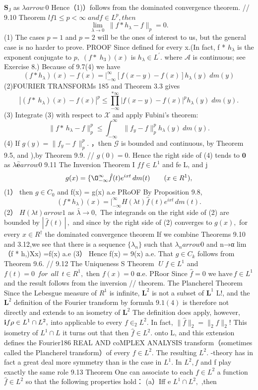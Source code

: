 ${\boldsymbol{S}}_{\mathsf{J}}$ as $\lambda{ arrow}\,0$ Hence（1)）follows from the dominated convergence theorem. // 9.10 Theorem $l f1\leq p<\infty\;a n d f\in L^{p},t h e n$ $$ \operatorname*{lim}_{\lambda\to0}\;\|f*h_{\lambda}-f\|_{p}=0. $$ (1) The cases $p=1$ and $p=2$ will be the ones of interest to us, but the general case is no harder to prove. PROOF Since defined for every x.(In fact, f * $h_{\lambda}$ is the exponent conjugate to $p,\;(f*\;h_{3})(x)$ is $h_{\lambda}\in L^{\prime}.$ where $\scriptstyle{\mathcal{A}}$ is continuous; see Exercise 8.) Because of 9.7(4) we have $$ (f*h_{\lambda})(x)-f(x)=\left.\right|_{-\infty}^{\infty}[f(x-y)-f(x)]h_{\lambda}(y)\;d m(y) $$ (2)FOURIER TRANSFORMs 185 and Theorem 3.3 gives $$ |(f*~h_{\lambda})(x)-f(x)|^{p}\leq\prod_{-\infty}^{*\infty}|f(x-y)-f(x)|^{p}h_{\lambda}(y)\;d m(y). $$ (3) Integrate (3) with respect to $\scriptstyle{\mathcal{X}}$ and apply Fubini's theorem: $$ \|f*\,h_{\lambda}-f\|_{p}^{p}\leq\int_{-\infty}^{\infty}\|f_{y}-f\|_{p}^{p}h_{\lambda}(y)\ d m(y). $$ (4) If $g(y)=\|f_{y}-f\,\|_{p}^{p}.$ ，then $\scriptstyle{\mathcal{G}}$ is bounded and continuous, by Theorem 9.5, and ),by Theorem 9.9. // $g(0)=0.$ Hence the right side of (4) tends to $\mathbf{0}$ as $\lambda\mathbf{\hat{e}} arrow0$ 9.11 The Inversion Theorem I $f f\in L^{1}$ and fe L, and j $$ g(x)= \{\O_{-\infty}^{\infty}{\hat{f}}(t)e^{i x t}\,d m(t)\qquad(x\in R^{1}), $$ (1） then $g\in C_{0}$ and f(x) = g(x) a.e PRoOF By Proposition 9.8, $$ (f*h_{\lambda})(x)=\left.\right|_{-\infty}^{\infty}H(\lambda t)\hat{f}(t)e^{i x t}\,d m(t). $$ (2） $H(\lambda t) arrow1$ as ${\bar{\lambda}}\to0,$ The integrands on the right side of (2) are bounded by $|\,{\hat{f}}(t)\,|\,,$ and since by the right side of (2) converges to $g(x),$ for every $x\in R^{\dagger}$ the dominated convergence theorem If we combine Theorems 9.10 and 3.12,we see that there is a sequence $\{\lambda_{n}\}$ such that $\lambda_{n} arrow0$ and n→α lim （f * h,)Xx) =f(x) a.e (3） Hence f(x) = 9(x) a.e. That $g\in C_{k}$ follows from Theorem 9.6. // 9.12 The Uniqueness S Theorem $\;U\;f\in L^{1}$ and $f(t)=0~~f o r~~a l l~~t\in R^{1},$ then $f(x)=0$ α.e. PRoor Since ${\hat{f}}=0$ we ${\mathrm{have}}\,f\in L^{1}$ and the result follows from the inversion // theorem. The Plancherel Theorem Since the Lebesgue measure of $R^{1}$ is infinite, ${\boldsymbol{L}}^{2}$ is not a subset of ${\boldsymbol{L}}^{1}$ L!, and the ${\boldsymbol{L}}^{2}$ definition of the Fourier transform by formula $9.1(4)$ is therefore not directly and extends to an isometry of ${\boldsymbol{L}}^{2}$ The definition does apply, however, ${\bf i}f\rho\in L^{1}\cap L^{2},$ into applicable to every $f\in_{2}L^{2}.$ In fact, $\|{\hat{f}}\|_{2}=\|_{2}f\|_{2}!$ This isometry of $L^{1}\cap L$ it turns out that then ${\hat{f}}\in L^{2}.$ onto L, and this extension defines the Fourier186 REAL AND coMPLEX ANALYSIS transform（sometimes called the Plancherel transform）of every $f\in L^{2}.$ The resulting $L^{2}.$ -theory has in fact a great deal more symmetry than is the case in $L^{1}.$ In $L^{2},f$ and f play exactly the same role 9.13 Theorem One can associate to each $f\in L^{2}$ a function ${\hat{f}}\in L^{2}$ so that the following properties hold： (a）Iff e $L^{1}\cap L^{2},$ ,then 